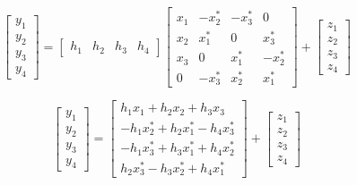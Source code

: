 \documentclass[fleqn]{article}
\begin{document}
\begin{enumerate}
\begin{enumerate}
			\begin{equation*}
				\begin{bmatrix}
					y_1 \\ y_2 \\ y_3 \\ y_4
				\end{bmatrix} = \begin{bmatrix}
					h_1 & h_2 & h_3 & h_4
				\end{bmatrix}\begin{bmatrix}
					x_1 & -x_2^* & -x_3^* &  0 \\ 
					x_2 &  x_1^* &  0     &  x_3^* \\
					x_3 &  0     &  x_1^* & -x_2^* \\
					0   & -x_3^* &  x_2^* &  x_1^*
				\end{bmatrix} + \begin{bmatrix}
					z_1 \\ z_2 \\ z_3 \\ z_4
				\end{bmatrix}
			\end{equation*}
			
			\begin{equation*}
				\begin{bmatrix}
					y_1 \\ y_2 \\ y_3 \\ y_4
				\end{bmatrix} = \begin{bmatrix}
					 h_1x_1   + h_2x_2   + h_3x_3 \\
					-h_1x_2^* + h_2x_1^* - h_4x_3^* \\
					-h_1x_3^* + h_3x_1^* + h_4x_2^* \\
					 h_2x_3^* - h_3x_2^* + h_4x_1^*
				\end{bmatrix} + \begin{bmatrix}
					z_1 \\ z_2 \\ z_3 \\ z_4
				\end{bmatrix}
			\end{equation*}
			

\end{enumerate}
\end{enumerate}
\end{document}
